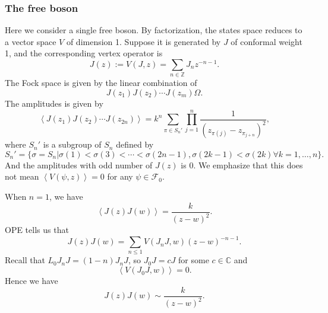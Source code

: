 \documentclass[10pt,reqno,draft]{article}
\numberwithin{equation}{section}
\numberwithin{figure}{section}
\numberwithin{table}{section}
\theoremstyle{plain}
\theoremstyle{definition}
\theoremstyle{remark}
\begin{document}
  \subsubsection{The free boson}
  Here we consider a single free boson. By factorization, the states space reduces to a vector space \(V\) of dimension 1. Suppose it is generated by \(J\) of conformal weight 1, and the corresponding vertex operator is 
  \begin{equation}
    J(z):=V(J,z)=\sum_{n\in \mathbb{Z}} J_{n}z^{-n-1}.
  \end{equation}
  The Fock space is given by the linear combination of 
  \begin{equation}
    J(z_1)J(z_2)\cdots J(z_{m})\Omega.
  \end{equation}
  The amplitudes is given by
  \begin{equation}
    \left< J(z_1)J(z_2)\cdots J(z_{2n}) \right> = k^{n}\sum_{\pi\in S_{n}'} \prod_{j=1}^{n} \frac{1}{(z_{\pi(j)}-z_{\pi_{j+n}})^{2}},
  \end{equation}
  where \(S_{n}'\) is a subgroup of \(S_{n}\) defined by
  \begin{equation}
    S_{n}'=\{\sigma=S_{n}|\sigma(1)<\sigma(3)<\cdots<\sigma(2n-1),\sigma(2k-1)<\sigma(2k)\forall k=1,\ldots,n\} .
  \end{equation}
  And the amplitudes with odd number of \(J(z)\) is 0. We emphasize that this does not mean \(\left<V(\psi,z) \right> =0\) for any \(\psi\in \mathcal{F}_{0}\).

  When \(n=1 \), we have 
  \[
  \left<J(z)J(w) \right> = \frac{k}{(z-w)^2}
  .\] 
  OPE tells us that 
  \begin{equation}
    J(z)J(w)=\sum_{n\le 1} V(J_{n}J,w)(z-w)^{-n-1}. 
  \end{equation}
  Recall that \(L_0J_{n}J=(1-n)J_{n}J\), so \(J_0J=cJ\) for some \(c\in \mathbb{C}\) and
  \[
      \left<V(J_0J,w) \right> =0.
  \]
  Hence we have 
  \begin{equation}
    J(z)J(w)\sim \frac{k}{(z-w)^2}.
  \end{equation}
  
    
    
\end{document}
